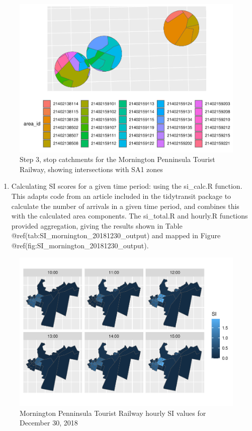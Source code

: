 \documentclass[preprint, 3p,
authoryear]{elsarticle} %
\providecommand{\tightlist}{%
  \setlength{\itemsep}{0pt}\setlength{\parskip}{0pt}}
\begin{document}
\begin{figure}
\includegraphics[width=1\linewidth]{Leveraging_GTFS_to_assess_transit_supply_Transport_Geography_files/figure-latex/calculate_stop_in_or_near_areas_verbose-1} \caption{Step 3, stop catchments for the Mornington Penninsula Tourist Railway, showing intersections with SA1 zones}\label{fig:calculate_stop_in_or_near_areas_verbose}
\end{figure}

\begin{enumerate}
\def\labelenumi{(\arabic{enumi})}
\setcounter{enumi}{3}
\tightlist
\item
  Calculating SI scores for a given time period: using the si\_calc.R
  function. This adapts code from an article included in the tidytransit
  package \citep{tidytransit_departure_timetable} to calculate the
  number of arrivals in a given time period, and combines this with the
  calculated area components. The si\_total.R and hourly.R functions
  provided aggregation, giving the results shown in Table
  @ref(tab:SI\_mornington\_20181230\_output) and mapped in Figure
  @ref(fig:SI\_mornington\_20181230\_output).
\end{enumerate}

\begin{figure}
\centering
\includegraphics{Leveraging_GTFS_to_assess_transit_supply_Transport_Geography_files/figure-latex/SI_mornington_20181230_output-1.pdf}
\caption{Mornington Penninsula Tourist Railway hourly SI values for
December 30, 2018}
\end{figure}
\end{document}
